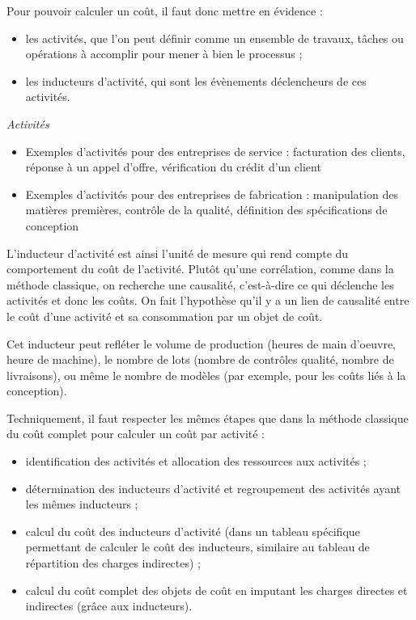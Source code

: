 \documentclass[oneside]{kaobook}
\begin{document}
Pour pouvoir calculer un coût, il faut donc mettre en évidence :
\begin{itemize}
\item les activités, que l'on peut définir comme un ensemble de travaux, tâches ou opérations à accomplir pour mener à bien le processus ;
\item les inducteurs d'activité, qui sont les évènements déclencheurs de ces activités.
\end{itemize}

\begin{kaobox}
\emph{Activités}
\begin{itemize}
\item Exemples d'activités pour des entreprises de service : facturation des clients, réponse à un appel d’offre, vérification du crédit d’un client
\item Exemples d'activités pour des entreprises de fabrication : manipulation des matières premières, contrôle de la qualité, définition des spécifications de conception
\end{itemize}
\end{kaobox}

L'inducteur d'activité est ainsi l'unité de mesure qui rend compte du comportement du coût de l’activité. Plutôt qu'une corrélation, comme dans la méthode classique, on recherche une causalité, c'est-à-dire ce qui déclenche les activités et donc les coûts. On fait l'hypothèse qu'il y a un lien de causalité entre le coût d’une activité et sa consommation par un objet de coût. 

Cet inducteur peut refléter le volume de production (heures de main d'oeuvre, heure de machine), le nombre de lots (nombre de contrôles qualité, nombre de livraisons), ou même le nombre de modèles (par exemple, pour les coûts liés à la conception).

Techniquement, il faut respecter les mêmes étapes que dans la méthode classique du coût complet pour calculer un coût par activité :
\begin{itemize}
\item identification des activités et allocation des ressources aux activités ;
\item détermination des inducteurs d’activité et regroupement des activités ayant les mêmes inducteurs ;
\item calcul du coût des inducteurs d’activité (dans un tableau spécifique permettant de calculer le coût des inducteurs, similaire au tableau de répartition des charges indirectes) ;
\item calcul du coût complet des objets de coût en imputant les charges directes et indirectes (grâce aux inducteurs).
\end{itemize}
\end{document}
